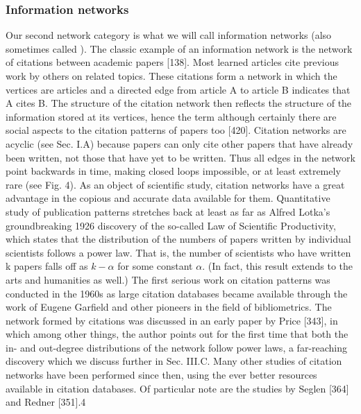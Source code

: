     \subsubsection{Information networks}
      
      Our second network category is what we will call information networks (also sometimes called ). The classic example of an information network is the network of citations between academic papers [138]. Most learned articles cite previous work by others on related topics. These citations form a network in which the vertices are articles and a directed edge from article A to article B indicates that A cites B. The structure of the citation network then reflects the structure of the information stored at its vertices, hence the term  although certainly there are social aspects to the citation patterns of papers too [420].
Citation networks are acyclic (see Sec. I.A) because papers can only cite other papers that have already been written, not those that have yet to be written. Thus all edges in the network point backwards in time, making closed loops impossible, or at least extremely rare (see Fig. 4).
As an object of scientific study, citation networks have a great advantage in the copious and accurate data available for them. Quantitative study of publication patterns stretches back at least as far as Alfred Lotka's groundbreaking 1926 discovery of the so-called Law of Scientific Productivity, which states that the distribution of the numbers of papers written by individual scientists follows a power law. That is, the number of scientists who have written k papers falls off as $k−\alpha$ for some constant $\alpha$. (In fact, this result extends to the arts and humanities as well.) The first serious work on citation patterns was conducted in the 1960s as large citation databases became available through the work of Eugene Garfield and other pioneers in the field of bibliometrics. The network formed by citations was discussed in an early paper by Price [343], in which among other things, the author points out for the first time that both the in- and out-degree distributions of the network follow power laws, a far-reaching discovery which we discuss further in Sec. III.C. Many other studies of citation networks have been performed since then, using the ever better resources available in citation databases. Of particular note are the studies by Seglen [364] and Redner [351].4
        
